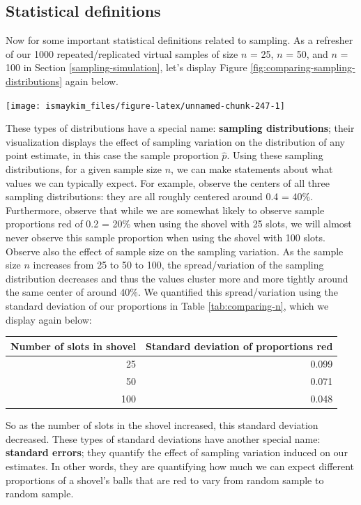 \documentclass[12pt, krantz2,]{krantz}
\begin{document}
\hypertarget{statistical-definitions}{%
\subsection{Statistical definitions}\label{statistical-definitions}}

Now for some important statistical definitions related to sampling. As a refresher of our 1000 repeated/replicated virtual samples of size \(n\) = 25, \(n\) = 50, and \(n\) = 100 in Section \ref{sampling-simulation}, let's display Figure \ref{fig:comparing-sampling-distributions} again below.

\begin{center}\texttt{[image: ismaykim\_files/figure-latex/unnamed-chunk-247-1]} \end{center}

These types of distributions have a special name: \textbf{sampling distributions}; their visualization displays the effect of sampling variation on the distribution of any point estimate, in this case the sample proportion \(\widehat{p}\). Using these sampling distributions, for a given sample size \(n\), we can make statements about what values we can typically expect. For example, observe the centers of all three sampling distributions: they are all roughly centered around 0.4 = 40\%. Furthermore, observe that while we are somewhat likely to observe sample proportions red of 0.2 = 20\% when using the shovel with 25 slots, we will almost never observe this sample proportion when using the shovel with 100 slots. Observe also the effect of sample size on the sampling variation. As the sample size \(n\) increases from 25 to 50 to 100, the spread/variation of the sampling distribution decreases and thus the values cluster more and more tightly around the same center of around 40\%. We quantified this spread/variation using the standard deviation of our proportions in Table \ref{tab:comparing-n}, which we display again below:

\begin{tabular}{r|r}
\hline
Number of slots in shovel & Standard deviation of proportions red\\
\hline
25 & 0.099\\
\hline
50 & 0.071\\
\hline
100 & 0.048\\
\hline
\end{tabular}

So as the number of slots in the shovel increased, this standard deviation decreased. These types of standard deviations have another special name: \textbf{standard errors}; they quantify the effect of sampling variation induced on our estimates. In other words, they are quantifying how much we can expect different proportions of a shovel's balls that are red to vary from random sample to random sample.
\end{document}
